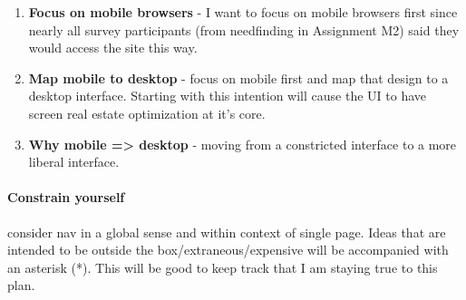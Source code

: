 \begin{enumerate}
\item
  \textbf{Focus on mobile browsers} - I want to focus on mobile browsers first since nearly all survey participants (from needfinding in Assignment M2) said they would access the site this way.
\item
  \textbf{Map mobile to desktop} - focus on mobile first and map that design to a desktop interface. Starting with this intention will cause the UI to have screen real estate optimization at it's core.
\item
  \textbf{Why mobile => desktop} - moving from a constricted interface to a more liberal interface.
\end{enumerate}


\clearpage


\paragraph{Constrain yourself} consider nav in a global sense and within context of single page. Ideas that are intended to be outside the box/extraneous/expensive will be accompanied with an asterisk (*). This will be good to keep track that I am staying true to this plan.

